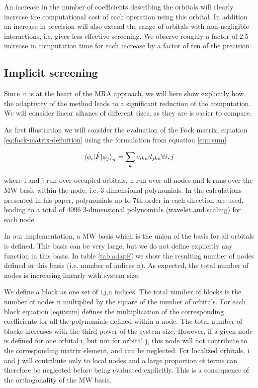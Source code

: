 \documentclass[%
 aip,
 amsmath,amssymb,
 reprint,%
]{revtex4-1}
\begin{document}
An increase in the number of coefficients describing the orbitals will clearly increase the computational cost of each operation using this orbital. In addition an increase in precision will also extend the range of orbitals with non-negligible interactions, i.e. gives less effective screening.
We observe roughly a factor of 2.5 increase in computation time for each increase by a factor of ten of the precision. 



\subsection{Implicit screening} %
\label{sec:screen}

Since it is at the heart of the MRA approach, we will here show explicitly how the adaptivity of the method leads to a significant reduction of the computation. We will consider linear alkanes of different sizes, as they are is easier to compare.

As first illustration we will consider the evaluation  of the Fock matrix, equation \ref{eq:fock-matrix-definition} using the formulation from equation \ref{equ:sum}

\begin{equation}
\label{equ:sums}
 \braket{\phi_i | {\hat F} |\phi_j}_n = \sum_{k} c_{ikn} d_{jkn} \forall i,j  
\end{equation}

where i and j run over occupied orbitals, n run over all nodes and
k runs over the MW basis within the node, i.e. 3 dimensional polynomials. In the calculations presented in his paper, polynomials up to 7th order in each direction are used, leading to a total of 4096 3-dimensional polynomials (wavelet and scaling) for each node.

 In our implementation, a MW basis which is the union of the basis for all orbitals is defined. This basis can be very large, but we do not define explicitly any function in this basis. In table \ref{tab:adapF} we show the resulting number of nodes defined in this basis (i.e. number of indices n). As expected, the total number of nodes is increasing linearly with system size.
 
 We define a block as one set of {i,j,n} indices. The total number of blocks  is the number of nodes n multiplied by the square of the number of orbitals. For each block equation \ref{equ:sum} defines the multiplication of the corresponding coefficients for all the polynomials defined within a node. The total number of blocks increases with the third power of the system size. However, if a given node is defined for one orbital i, but not for orbital j, this node will not contribute to the corresponding matrix element, and can be neglected. For localized orbitals, i and j will contribute only to local nodes and a large proportion of terms can therefore be neglected before being evaluated explicitly. This is a consequence of the orthogonality of the MW basis.
 
\end{document}
